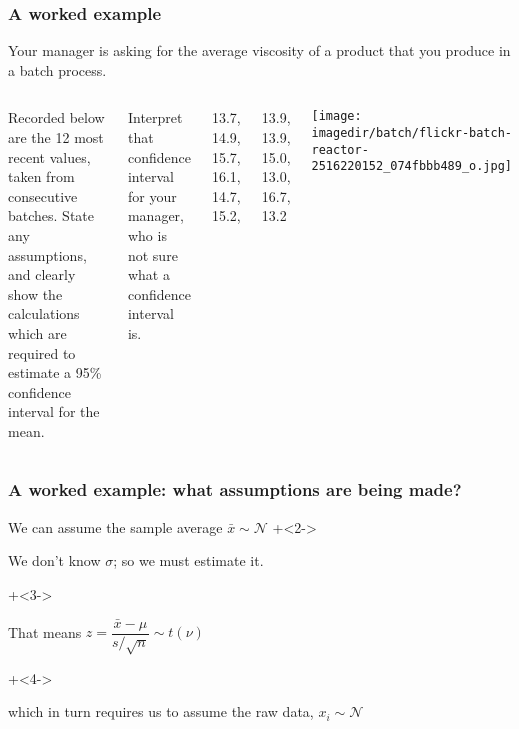 \begin{frame}\frametitle{A worked example}
	Your manager is asking for the average viscosity of a product that you produce in a batch process. 
	
	\begin{columns}[T]
			\vspace{10pt}
			Recorded below are the 12 most recent values, taken from consecutive batches. State any assumptions, and clearly show the calculations which are required to estimate a 95\% confidence interval for the mean. 
	
			\vspace{10pt}
			Interpret that confidence interval for your manager, who is not sure what a confidence interval is.
	
			\vspace{10pt}
			13.7, 14.9, 15.7, 16.1, 14.7, 15.2, 
			
			13.9, 13.9, 15.0, 13.0, 16.7, 13.2
			\centerline{\texttt{[image: \\imagedir/batch/flickr-batch-reactor-2516220152\_074fbbb489\_o.jpg]} }
	\end{columns}
\end{frame}

\begin{frame}\frametitle{A worked example: what assumptions are being made?}
	\begin{itemize}
		\item	We can assume the sample average $\bar{x} \sim \mathcal{N}$
		\onslide+<2->{
			\item	We don't know $\sigma$; so we must estimate it. 
		}
		\onslide+<3->{
			\item	That means $z = \dfrac{\bar{x} - \mu}{s / \sqrt{n}} \sim t(\nu)$
		}
		\onslide+<4->{
			\item	which in turn requires us to assume the raw data, $x_i \sim \mathcal{N}$
		}
	\end{itemize}
\end{frame}

